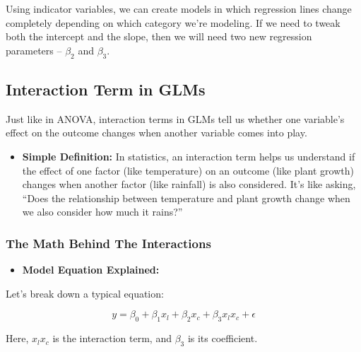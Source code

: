 \documentclass[
  letterpaper,
  DIV=11,
  numbers=noendperiod]{scrreprt}
\providecommand{\tightlist}{%
  \setlength{\itemsep}{0pt}\setlength{\parskip}{0pt}}
\begin{document}
Using indicator variables, we can create models in which regression
lines change completely depending on which category we're modeling. If
we need to tweak both the intercept and the slope, then we will need two
new regression parameters -- \(\beta_2\) and \(\beta_3\).

\subsection{Interaction Term in GLMs}\label{interaction-term-in-glms}

Just like in ANOVA, interaction terms in GLMs tell us whether one
variable's effect on the outcome changes when another variable comes
into play.

\begin{itemize}
\tightlist
\item
  \textbf{Simple Definition:} In statistics, an interaction term helps
  us understand if the effect of one factor (like temperature) on an
  outcome (like plant growth) changes when another factor (like
  rainfall) is also considered. It's like asking, ``Does the
  relationship between temperature and plant growth change when we also
  consider how much it rains?''
\end{itemize}

\subsubsection{The Math Behind The
Interactions}\label{the-math-behind-the-interactions}

\begin{itemize}
\tightlist
\item
  \textbf{Model Equation Explained:}
\end{itemize}

Let's break down a typical equation:

\[
y = \beta_0 + \beta_1x_l + \beta_2x_c + \beta_3x_lx_c + \epsilon
\]

Here, \(x_lx_c\) is the interaction term, and \(\beta _3\) is its
coefficient.
\end{document}
